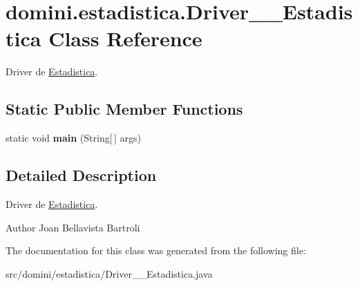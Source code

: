 \hypertarget{classdomini_1_1estadistica_1_1Driver____Estadistica}{}\section{domini.\+estadistica.\+Driver\+\_\+\+\_\+\+Estadistica Class Reference}
\label{classdomini_1_1estadistica_1_1Driver____Estadistica}


Driver de \hyperlink{classdomini_1_1estadistica_1_1Estadistica}{Estadistica}.  


\subsection*{Static Public Member Functions}
\begin{DoxyCompactItemize}
\item 
\mbox{\label{classdomini_1_1estadistica_1_1Driver____Estadistica_a7f11e0ccad919e427af9c591cf910bfe}} 
static void {\bfseries main} (String\mbox{[}$\,$\mbox{]} args)
\end{DoxyCompactItemize}


\subsection{Detailed Description}
Driver de \hyperlink{classdomini_1_1estadistica_1_1Estadistica}{Estadistica}. 

\begin{DoxyAuthor}{Author}
Joan Bellavista Bartroli 
\end{DoxyAuthor}


The documentation for this class was generated from the following file\+:\begin{DoxyCompactItemize}
\item 
src/domini/estadistica/Driver\+\_\+\+\_\+\+Estadistica.\+java\end{DoxyCompactItemize}
